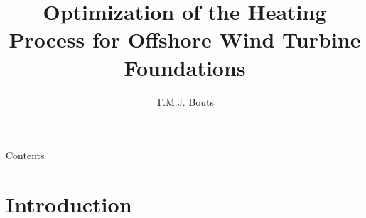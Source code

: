 \documentclass[11pt,aspectratio=43,mathserif]{beamer}
\begin{document}
\nocite{*} %

\title{Optimization of the Heating Process for Offshore Wind Turbine Foundations}
\author{T.M.J. Bouts}

\begin{frame}[noframenumbering]
    \titlepage
    \thispagestyle{empty}
\end{frame}


\begin{frame}{Contents}
\tableofcontents[hideallsubsections]
\end{frame}
\section{Introduction}
\end{document}
